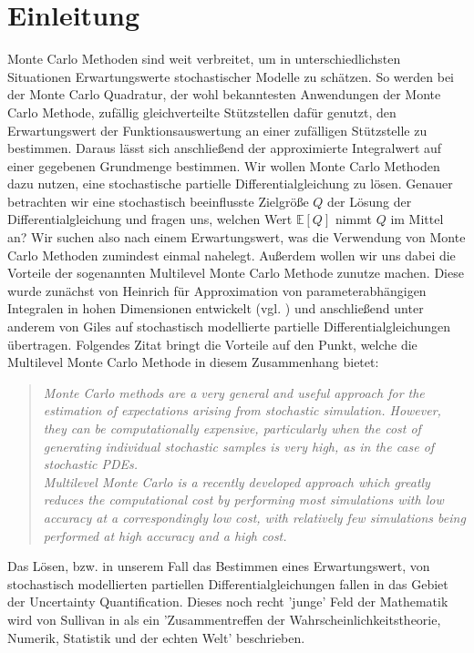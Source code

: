 
\section{Einleitung}

Monte Carlo Methoden sind weit verbreitet, um in unterschiedlichsten Situationen Erwartungswerte stochastischer Modelle zu schätzen.
So werden bei der Monte Carlo Quadratur, der wohl bekanntesten Anwendungen der Monte Carlo Methode, zufällig gleichverteilte Stützstellen dafür genutzt, den Erwartungswert der Funktionsauswertung an einer zufälligen Stützstelle zu bestimmen. Daraus lässt sich anschließend der approximierte Integralwert auf einer gegebenen Grundmenge bestimmen. 
Wir wollen Monte Carlo Methoden dazu nutzen, eine stochastische partielle Differentialgleichung zu lösen. 
Genauer betrachten wir eine stochastisch beeinflusste Zielgröße $ Q $ der Lösung der Differentialgleichung und fragen uns, welchen Wert $ \mathbb{E}[Q] $ nimmt $ Q $ im Mittel an? Wir suchen also nach einem Erwartungswert, was die Verwendung von Monte Carlo Methoden zumindest einmal nahelegt. 
Außerdem wollen wir uns dabei die Vorteile der sogenannten Multilevel Monte Carlo Methode zunutze machen. Diese wurde zunächst von Heinrich für Approximation von parameterabhängigen Integralen in hohen Dimensionen entwickelt (vgl. \cite{heinrich2001multilevel}) und anschließend unter anderem von  Giles auf stochastisch modellierte partielle Differentialgleichungen übertragen. Folgendes Zitat bringt die Vorteile auf den Punkt, welche die Multilevel Monte Carlo Methode in diesem Zusammenhang bietet:
\begin{quote}
	\textit{Monte Carlo methods are a very general and useful approach for the estimation of expectations arising from stochastic simulation. However, they can be computationally expensive, particularly when the cost of generating individual stochastic samples is very high, as in the case of stochastic PDEs. \\ Multilevel Monte Carlo is a recently developed approach which greatly reduces the computational cost by performing most simulations with low accuracy at a correspondingly low cost, with relatively few simulations being performed at high accuracy and a high cost.}  \\
\end{quote}
Das Lösen, bzw. in unserem Fall das Bestimmen eines Erwartungswert, von stochastisch modellierten partiellen Differentialgleichungen fallen in das Gebiet der Uncertainty Quantification. Dieses noch recht 'junge' Feld der Mathematik wird von Sullivan in \cite{sullivan2015introduction} als ein 'Zusammentreffen der Wahrscheinlichkeitstheorie, Numerik, Statistik und der echten Welt' beschrieben. \\
